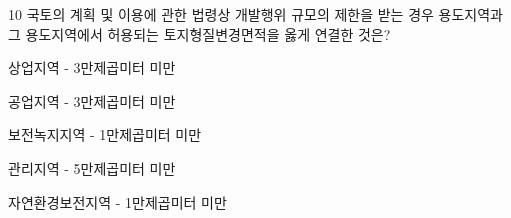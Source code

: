 \begin{question}{10}
국토의 계획 및 이용에 관한 법령상 개발행위 규모의 제한을 받는 경우 용도지역과 그 용도지역에서 허용되는 토지형질변경면적을 옳게 연결한 것은?
\begin{choices}
  \item 상업지역 - 3만제곱미터 미만
  \item 공업지역 - 3만제곱미터 미만
  \item 보전녹지지역 - 1만제곱미터 미만
  \item 관리지역 - 5만제곱미터 미만
  \item 자연환경보전지역 - 1만제곱미터 미만
\end{choices}
\end{question}
